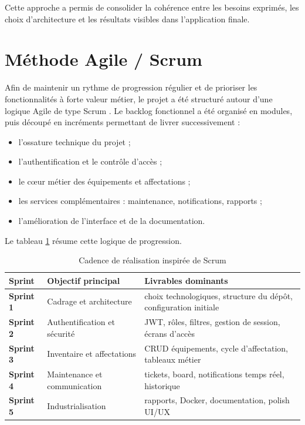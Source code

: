 ﻿\documentclass[12pt,a4paper,oneside]{report}
\begin{document}
Cette approche a permis de consolider la cohérence entre les besoins exprimés, les choix d'architecture et les résultats visibles dans l'application finale.

\section{Méthode Agile / Scrum}
Afin de maintenir un rythme de progression régulier et de prioriser les fonctionnalités à forte valeur métier, le projet a été structuré autour d'une logique Agile de type Scrum \cite{schwaber2020}. Le backlog fonctionnel a été organisé en modules, puis découpé en incréments permettant de livrer successivement :
\begin{itemize}
  \item l'ossature technique du projet ;
  \item l'authentification et le contrôle d'accès ;
  \item le cœur métier des équipements et affectations ;
  \item les services complémentaires : maintenance, notifications, rapports ;
  \item l'amélioration de l'interface et de la documentation.
\end{itemize}

Le tableau \ref{tab:scrum-cadence} résume cette logique de progression.

\begin{table}[H]
\centering
\caption{Cadence de réalisation inspirée de Scrum}
\label{tab:scrum-cadence}
\begin{tabularx}{\textwidth}{>{\bfseries}p{2cm}p{3.8cm}X}
\toprule
Sprint & Objectif principal & Livrables dominants \\
\midrule
Sprint 1 & Cadrage et architecture & choix technologiques, structure du dépôt, configuration initiale \\
Sprint 2 & Authentification et sécurité & JWT, rôles, filtres, gestion de session, écrans d'accès \\
Sprint 3 & Inventaire et affectations & CRUD équipements, cycle d'affectation, tableaux métier \\
Sprint 4 & Maintenance et communication & tickets, board, notifications temps réel, historique \\
Sprint 5 & Industrialisation & rapports, Docker, documentation, polish UI/UX \\
\bottomrule
\end{tabularx}
\end{table}
\end{document}
